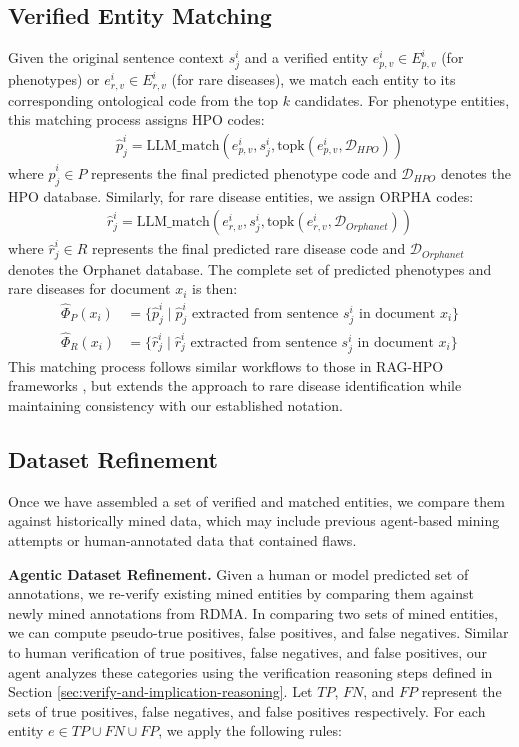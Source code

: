 \subsection{Verified Entity Matching}
Given the original sentence context $s_j^i$ and a verified entity $e_{p,v}^i \in E_{p,v}^i$ (for phenotypes) or $e_{r,v}^i \in E_{r,v}^i$ (for rare diseases), we match each entity to its corresponding ontological code from the top $k$ candidates. For phenotype entities, this matching process assigns HPO codes:
\begin{align}
\hat{p}_{j}^i = \text{LLM\_match}(e_{p,v}^i, s_j^i, \text{topk}(e_{p,v}^i, \mathcal{D}_{HPO}))
\end{align}
where $\hat{p}_{j}^i \in P$ represents the final predicted phenotype code and $\mathcal{D}_{HPO}$ denotes the HPO database. Similarly, for rare disease entities, we assign ORPHA codes:
\begin{align}
\hat{r}_{j}^i = \text{LLM\_match}(e_{r,v}^i, s_j^i, \text{topk}(e_{r,v}^i, \mathcal{D}_{Orphanet}))
\end{align}
where $\hat{r}_{j}^i \in R$ represents the final predicted rare disease code and $\mathcal{D}_{Orphanet}$ denotes the Orphanet database.
The complete set of predicted phenotypes and rare diseases for document $x_i$ is then:
\begin{align}
\hat{\Phi}_P(x_i) &= \{\hat{p}_{j}^i \mid \hat{p}_{j}^i \text{ extracted from sentence } s_j^i \text{ in document } x_i\} \\
\hat{\Phi}_R(x_i) &= \{\hat{r}_{j}^i \mid \hat{r}_{j}^i \text{ extracted from sentence } s_j^i \text{ in document } x_i\}
\end{align}
This matching process follows similar workflows to those in RAG-HPO frameworks \cite{garcia2024_HPORAG}, but extends the approach to rare disease identification while maintaining consistency with our established notation.

\subsection{Dataset Refinement} \label{sec: methodology - dataset refinement_ex}
Once we have assembled a set of verified and matched entities, we compare them against historically mined data, which may include previous agent-based mining attempts or human-annotated data \cite{dong2023ontology_poor_annotations} that contained flaws.

\textbf{Agentic Dataset Refinement.} Given a human or model predicted set of annotations, we re-verify existing mined entities by comparing them against newly mined annotations from RDMA. In comparing two sets of mined entities, we can compute pseudo-true positives, false positives, and false negatives.  Similar to human verification of true positives, false negatives, and false positives, our agent analyzes these categories using the verification reasoning steps defined in Section \ref{sec:verify-and-implication-reasoning}. Let $TP$, $FN$, and $FP$ represent the sets of true positives, false negatives, and false positives respectively. For each entity $e \in TP \cup FN \cup FP$, we apply the following rules:


